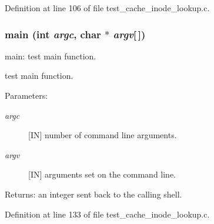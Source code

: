 Definition at line 106 of file test\_\-cache\_\-inode\_\-lookup.c.
\subsubsection[{main}]{\setlength{\rightskip}{0pt plus 5cm}main (int {\em argc}, \/  char $\ast$ {\em argv}[$\,$])}\label{test__cache__inode__lookup_8c_e0665038b72011f5c680c660fcb59459}


main: test main function.

test main function.

\begin{Desc}
\item[Parameters:]
\begin{description}
\item[{\em argc}][IN] number of command line arguments. \item[{\em argv}][IN] arguments set on the command line.\end{description}
\end{Desc}
\begin{Desc}
\item[Returns:]an integer sent back to the calling shell. \end{Desc}


Definition at line 133 of file test\_\-cache\_\-inode\_\-lookup.c.